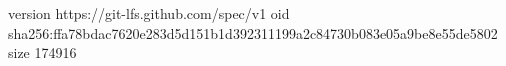 version https://git-lfs.github.com/spec/v1
oid sha256:ffa78bdac7620e283d5d151b1d392311199a2c84730b083e05a9be8e55de5802
size 174916
